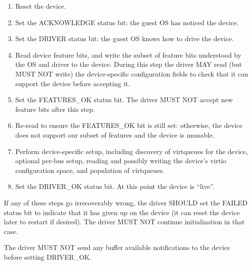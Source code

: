 \begin{enumerate}
\item Reset the device.

\item Set the ACKNOWLEDGE status bit: the guest OS has noticed the device.

\item Set the DRIVER status bit: the guest OS knows how to drive the device.

\item\label{itm:General Initialization And Device Operation /
Device Initialization / Read feature bits} Read device feature bits, and write the subset of feature bits
   understood by the OS and driver to the device.  During this step the
   driver MAY read (but MUST NOT write) the device-specific configuration fields to check that it can support the device before accepting it.

\item\label{itm:General Initialization And Device Operation / Device Initialization / Set FEATURES-OK} Set the FEATURES_OK status bit.  The driver MUST NOT accept
   new feature bits after this step.

\item\label{itm:General Initialization And Device Operation / Device Initialization / Re-read FEATURES-OK} Re-read  to ensure the FEATURES_OK bit is still
   set: otherwise, the device does not support our subset of features
   and the device is unusable.

\item\label{itm:General Initialization And Device Operation / Device Initialization / Device-specific Setup} Perform device-specific setup, including discovery of virtqueues for the
   device, optional per-bus setup, reading and possibly writing the
   device's virtio configuration space, and population of virtqueues.

\item\label{itm:General Initialization And Device Operation / Device Initialization / Set DRIVER-OK} Set the DRIVER_OK status bit.  At this point the device is
   ``live''.
\end{enumerate}

If any of these steps go irrecoverably wrong, the driver SHOULD
set the FAILED status bit to indicate that it has given up on the
device (it can reset the device later to restart if desired).  The
driver MUST NOT continue initialization in that case.

The driver MUST NOT send any buffer available notifications to
the device before setting DRIVER_OK.

